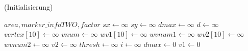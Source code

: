 \begin{algorithm}[ht]
\caption{ (Initialisierung)}
\label{alg:checksquare-1}
\begin{algorithmic}[1]
	\Require $\mathit{area}, \mathit{marker\_infoTWO}, \mathit{factor}$
	\State $\mathit{sx} \gets \infty$
	\State $\mathit{sy} \gets \infty$
	\State $\mathit{dmax} \gets \infty$
	\State $\mathit{d} \gets \infty$
	\State $\mathit{vertex}[10] \gets \infty$
	\State $\mathit{vnum} \gets \infty$
	\State $\mathit{wv1}[10] \gets \infty$
	\State $\mathit{wvnum1} \gets \infty$
	\State $\mathit{wv2}[10] \gets \infty$
	\State $\mathit{wvnum2} \gets \infty$
	\State $\mathit{v2} \gets \infty$
	\State $\mathit{thresh} \gets \infty$
	\State $i \gets \infty$
	\State $\mathit{dmax} \gets 0$
	\State $\mathit{v1} \gets 0$
\end{algorithmic}
\end{algorithm}
